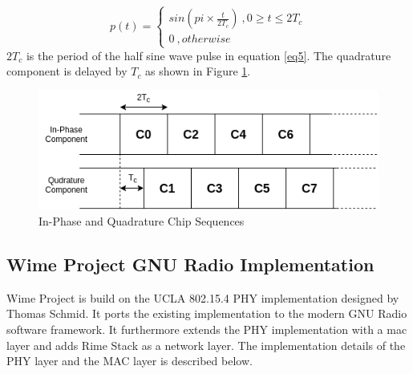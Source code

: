 \begin{equation}\label{eq5}
p(t) = 
\begin{cases} 
   sin( pi \times \frac{t}{2T_c})  \ ,0 \geq t \leq 2T_c \\
   0    \ ,otherwise
  \end{cases}
\end{equation}
$2T_c$ is the period of the half sine wave pulse in equation \ref{eq5}.
The quadrature component is delayed by $T_c$ as shown in Figure \ref{IQ_TC}.

\begin{figure}[h!]
\centering
\includegraphics[scale=0.6]{Figure/IQ_TC.png}
\caption{In-Phase and Quadrature Chip Sequences}
\label{IQ_TC}
\end{figure}

\subsection{Wime Project GNU Radio Implementation}
Wime Project is build on the UCLA 802.15.4 PHY implementation designed  by Thomas Schmid.
It ports the existing implementation to the modern GNU Radio software framework.
It furthermore extends the PHY implementation with a \ac{mac} layer and adds Rime Stack as a network layer.
The implementation details of the PHY layer and the MAC layer is described below.\\

